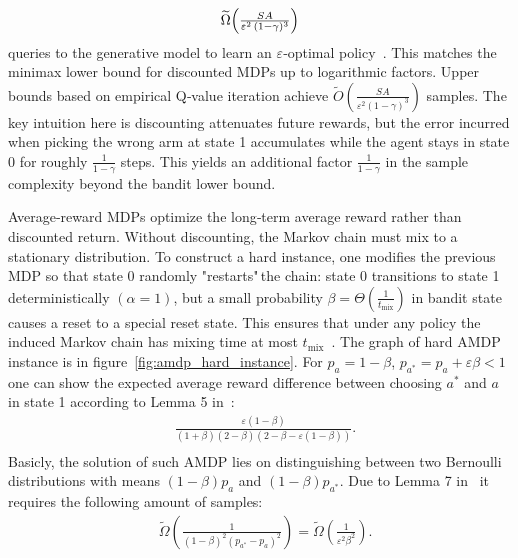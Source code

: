 \documentclass{article}
\numberwithin{equation}{section}
\renewcommand{\epsilon}{\varepsilon}
\begin{document}
$$\widetilde{\Omega}\Bigl(\tfrac{SA}{\epsilon^{2}\,(1-\gamma)^{3}}\Bigr)$$
queries to the generative model to learn an $\epsilon$‑optimal policy~\cite{jin2021towards}. This matches the minimax lower bound for discounted MDPs up to logarithmic factors. Upper bounds based on empirical Q‑value iteration achieve $\tilde{O}\left(\tfrac{SA}{\epsilon^2(1-\gamma)^3}\right)$ samples. The key intuition here is discounting attenuates future rewards, but the error incurred when picking the wrong arm at state 1 accumulates while the agent stays in state 0 for roughly $\tfrac{1}{1-\gamma}$ steps. This yields an additional factor $\tfrac{1}{1-\gamma}$ in the sample complexity beyond the bandit lower bound.

Average‑reward MDPs optimize the long‑term average reward rather than discounted return. Without discounting, the Markov chain must mix to a stationary distribution. To construct a hard instance, one modifies the previous MDP so that state 0 randomly "restarts"\,the chain: state 0 transitions to state 1 {deterministically $(\alpha = 1)$, but a small probability $\beta=\Theta\left(\tfrac{1}{t_{\mathrm{mix}}}\right)$ in bandit} state causes a reset to a special {reset} state. This ensures that under any policy the induced Markov chain has mixing time at most $t_{\mathrm{mix}}$~\cite{jin2021towards}. The graph of hard AMDP instance is in figure~\ref{fig:amdp_hard_instance}. {For $p_a = 1 - \beta$, $p_{a^*} = p_a + \epsilon\beta < 1$ one can show the} expected average reward difference between choosing $a^*$ and $a$ in state 1 {according to Lemma 5 in~\cite{jin2021towards}}:
\begin{equation*}
    \begin{aligned}
        &{\frac{\epsilon(1 - \beta)}{(1 + \beta)(2 - \beta)(2 - \beta - \epsilon(1 - \beta))}.}\\
    \end{aligned}
\end{equation*}
{Basicly, the solution of such AMDP lies on distinguishing between two Bernoulli distributions with means $(1 - \beta)p_a$ and $(1 - \beta)p_{a^*}$. Due to Lemma 7 in~\cite{jin2021towards} it requires the following amount of samples:}
\begin{equation*}
    \begin{aligned}
        &{\widetilde{\Omega}\left(\frac{1}{(1 - \beta)^2(p_{a^*} - p_a)^2}\right) = \widetilde{\Omega}\left(\frac{1}{\epsilon^2\beta^2}\right).}\\
    \end{aligned}
\end{equation*}
\end{document}
